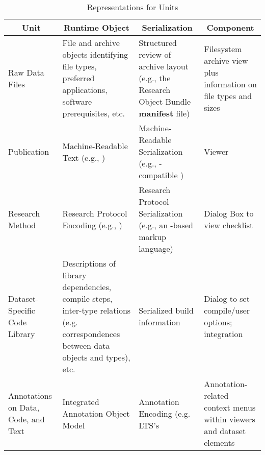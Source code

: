 \begin{table}
\renewcommand{\arraystretch}{2}
\label{tab:sdrm}
\begin{scriptsize}
\begin{center}
\begin{tabular}{|p{}|p{}|p{}|p{}|}
\multicolumn{1}{c}{\textbf{\sSDRM{} Unit}} &%
\multicolumn{1}{c}{\textbf{Runtime Object}} &%
\multicolumn{1}{c}{\textbf{Serialization}} &%
\multicolumn{1}{c}{\textbf{\sGUI{} Component}} \\%
\midrule
\RaggedRight{}Raw Data Files &\RaggedRight{} File and archive objects identifying file types, 
preferred applications, software prerequisites, etc. 
&\RaggedRight{} Structured review of archive layout (e.g., the Research Object 
Bundle \textbf{manifest} file) 
&\RaggedRight{} Filesystem archive view plus information on file types and sizes  \\%
Publication &\RaggedRight{} Machine-Readable Text (e.g., \sHTXN{}) 
&\RaggedRight{}  
Machine-Readable Serialization (e.g., \sHTXN{}-compatible \sLaTeX{}) 
&\RaggedRight{} \sPDF{} Viewer  \\%
\RaggedRight{}Research Method &\RaggedRight{} Research Protocol Encoding (e.g., \sBioCoder{}) 
&\RaggedRight{} Research Protocol Serialization (e.g., an \sMIBBI{}-based markup language) 
&\RaggedRight{} Dialog Box to view \q{Minimum Information} checklist   \\
\midrule
\RaggedRight{}Dataset-Specific Code Library &\RaggedRight{} Descriptions of library dependencies, compile 
steps, inter-type relations (e.g. correspondences between data objects and 
\sGUI{} types), etc. 
&\RaggedRight{} Serialized build information  
&\RaggedRight{} Dialog to set compile/user options; \sIDE{} integration  \\
\midrule
\RaggedRight{}Annotations on Data, Code, and Text &\RaggedRight{} Integrated Annotation Object 
Model &\RaggedRight{} Annotation Encoding (e.g. LTS's \q{Annotation Exchange Format}   
&\RaggedRight{} Annotation-related context menus within \sPDF{} viewers and 
dataset \sGUI{} elements 
\bottomrule
\end{tabular}
\end{center}
\end{scriptsize}
\caption{Representations for \SDRM{} Units}
\end{table}
 

